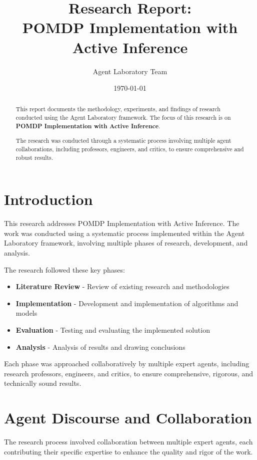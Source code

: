\documentclass[11pt,a4paper]{article}
\title{\textbf{\Large{Research Report:}} \\ \huge{\textsf{POMDP Implementation with Active Inference}}}
\author{Agent Laboratory Team}
\date{\today}
\begin{document}
\maketitle

\begin{abstract}
This report documents the methodology, experiments, and findings of research conducted using the Agent Laboratory framework. The focus of this research is on \textbf{POMDP Implementation with Active Inference}.

The research was conducted through a systematic process involving multiple agent collaborations, including professors, engineers, and critics, to ensure comprehensive and robust results.
\end{abstract}

\tableofcontents
\newpage

\section{Introduction}
This research addresses POMDP Implementation with Active Inference. The work was conducted using a systematic process implemented within the Agent Laboratory framework, involving multiple phases of research, development, and analysis.

The research followed these key phases:
\begin{itemize}

\item \textbf{Literature Review} - Review of existing research and methodologies
\item \textbf{Implementation} - Development and implementation of algorithms and models
\item \textbf{Evaluation} - Testing and evaluating the implemented solution
\item \textbf{Analysis} - Analysis of results and drawing conclusions

\end{itemize}

Each phase was approached collaboratively by multiple expert agents, including research professors, engineers, and critics, to ensure comprehensive, rigorous, and technically sound results.


\section{Agent Discourse and Collaboration}

The research process involved collaboration between multiple expert agents, each contributing their specific expertise to enhance the quality and rigor of the work.
\end{document}
